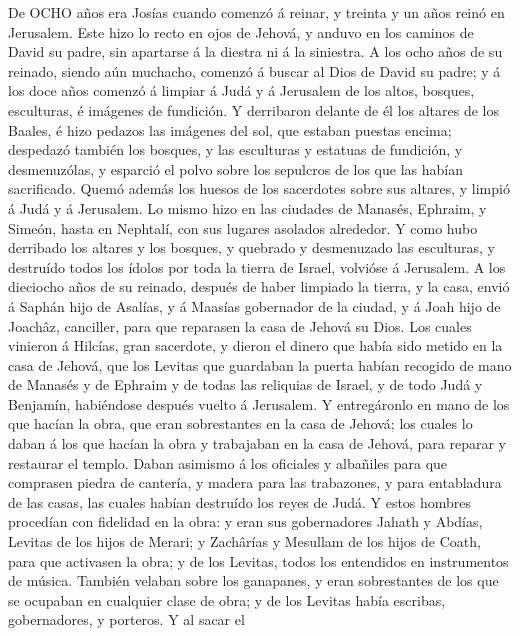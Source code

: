  De OCHO años era Josías cuando comenzó á reinar, y treinta
y un años reinó en Jerusalem.  Este hizo lo recto en ojos de
Jehová, y anduvo en los caminos de David su padre, sin apartarse á la
diestra ni á la siniestra.  A los ocho años de su reinado,
siendo aún muchacho, comenzó á buscar al Dios de David su padre; y á los
doce años comenzó á limpiar á Judá y á Jerusalem de los altos, bosques,
esculturas, é imágenes de fundición.  Y derribaron delante
de él los altares de los Baales, é hizo pedazos las imágenes del sol,
que estaban puestas encima; despedazó también los bosques, y las
esculturas y estatuas de fundición, y desmenuzólas, y esparció el polvo
sobre los sepulcros de los que las habían sacrificado. 
Quemó además los huesos de los sacerdotes sobre sus altares, y limpió á
Judá y á Jerusalem.  Lo mismo hizo en las ciudades de
Manasés, Ephraim, y Simeón, hasta en Nephtalí, con sus lugares asolados
alrededor.  Y como hubo derribado los altares y los bosques,
y quebrado y desmenuzado las esculturas, y destruído todos los ídolos
por toda la tierra de Israel, volvióse á Jerusalem.  A los
dieciocho años de su reinado, después de haber limpiado la tierra, y la
casa, envió á Saphán hijo de Asalías, y á Maasías gobernador de la
ciudad, y á Joah hijo de Joachâz, canciller, para que reparasen la casa
de Jehová su Dios.  Los cuales vinieron á Hilcías, gran
sacerdote, y dieron el dinero que había sido metido en la casa de
Jehová, que los Levitas que guardaban la puerta habían recogido de mano
de Manasés y de Ephraim y de todas las reliquias de Israel, y de todo
Judá y Benjamín, habiéndose después vuelto á Jerusalem.  Y
entregáronlo en mano de los que hacían la obra, que eran sobrestantes en
la casa de Jehová; los cuales lo daban á los que hacían la obra y
trabajaban en la casa de Jehová, para reparar y restaurar el templo.
 Daban asimismo á los oficiales y albañiles para que
comprasen piedra de cantería, y madera para las trabazones, y para
entabladura de las casas, las cuales habían destruído los reyes de Judá.
 Y estos hombres procedían con fidelidad en la obra: y eran
sus gobernadores Jahath y Abdías, Levitas de los hijos de Merari; y
Zachârías y Mesullam de los hijos de Coath, para que activasen la obra;
y de los Levitas, todos los entendidos en instrumentos de música.
 También velaban sobre los ganapanes, y eran sobrestantes
de los que se ocupaban en cualquier clase de obra; y de los Levitas
había escribas, gobernadores, y porteros.  Y al sacar el
